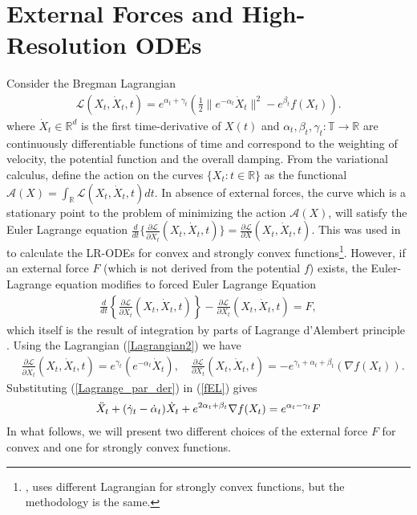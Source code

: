 \documentclass{article}
\theoremstyle{plain}
\theoremstyle{definition}
\theoremstyle{remark}
\begin{document}
\section{External Forces and High-Resolution ODEs}\label{section2}
Consider the Bregman Lagrangian
\begin{align}\label{Lagrangian2}
    \mathcal{L}(X_t,\dot{X}_t,t) =e^{\alpha_t+\gamma_t}\left(\frac{1}{2}\|e^{-\alpha_t}\dot{X}_t\|^2-e^{\beta_t}f(X_t)\right). 
\end{align}
where \(\dot{X}_t\in \mathbb{R}^d\) is the first time-derivative of \(X(t)\) and \(\alpha_t,\beta_t,\gamma_t:\mathbb{T}\rightarrow \mathbb{R}\) are continuously differentiable functions of time and correspond to the weighting of velocity, the potential function and the overall damping. From the variational calculus, define the action on the curves \(\{X_t:t\in \mathbb R\}\) as the functional \(\mathcal{A}(X)=\int_{\mathbb R}\mathcal{L}(X_t,\dot X_t,t)dt \). In absence of external forces, the curve which is a stationary point to the problem of minimizing the action \(\mathcal{A}(X)\), will satisfy the Euler Lagrange equation \({\tfrac{d}{dt}\{  \tfrac{\partial \mathcal{L}}{\partial \dot{X}_t}(X_t,\dot{X}_t,t)  \}=\tfrac{\partial \mathcal{L}}{\partial X}(X_t,\dot{X}_t,t)}\). This was used in \cite{WibisonoE7351,wilson2021lyapunov} to calculate the LR-ODEs for convex and strongly convex functions\footnote{\citep{wilson2021lyapunov}, uses different Lagrangian for strongly convex functions, but the methodology is the same.}. However, if an external force \(F\) (which is not derived from the potential \(f\)) exists, the Euler-Lagrange equation modifies to forced Euler Lagrange Equation
\begin{align}\label{fEL}
        \frac{d}{dt}\left\{  \frac{\partial \mathcal{L}}{\partial \dot{X}_t}(X_t,\dot{X}_t,t)  \right\}-\frac{\partial \mathcal{L}}{\partial X_t}(X_t,\dot{X}_t,t)=F,
\end{align}
which itself is the result of integration by parts of Lagrange d'Alembert principle \citep{campos2021discrete}. Using the Lagrangian (\ref{Lagrangian2}) we have
\begin{align}\label{Lagrange_par_der}
  &   \frac{\partial \mathcal{L}}{\partial \dot{X}_t}(X_t,\dot{X}_t,t)  =e^{\gamma_t}(e^{-\alpha_t}\dot{X}_t),\quad \frac{\partial \mathcal{L}}{\partial X_t}(X_t,\dot{X}_t,t)= -e^{\gamma_t+\alpha_t+\beta_t}(\nabla f(X_t)).
\end{align}
Substituting (\ref{Lagrange_par_der}) in (\ref{fEL}) gives
\begin{align}\label{HR_general_ODE_F}
    \Ddot{X}_t + (\dot{\gamma}_t-\dot{\alpha}_t)\dot{X}_t+e^{2\alpha_t+\beta_t}\nabla f(X_t) =e^{\alpha_t-\gamma_t} F
\end{align}
In what follows, we will present two different choices of the external force \(F\) for convex and one for strongly convex functions. 
\end{document}
